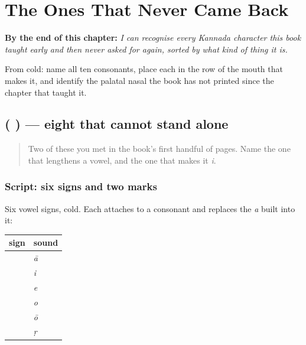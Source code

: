 
\chapter{The Ones That Never Came Back}
\label{ch:ka-ulidavu}

\begin{chapteropening}
\textbf{By the end of this chapter:} \emph{I can recognise every Kannada character this book taught early and then never asked for again, sorted by what kind of thing it is.}

From cold: name all ten consonants, place each in the row of the mouth that makes it, and identify the palatal nasal the book has not printed since the chapter that taught it.
\end{chapteropening}

\section[\texorpdfstring{(\kn{ಾ} \kn{ಿ} \kn{ೆ} \kn{ೊ} \kn{ೋ} \kn{ೃ} \kn{ಂ} \kn{ಃ})}{(ಾ ಿ ೆ ೊ ೋ ೃ ಂ ಃ)}]{(       ) — eight that cannot stand alone}

\label{lesson:KA-R81-signs-that-hang}



\begin{quote}
Two of these you met in the book's first handful of pages. Name the one that lengthens a vowel, and the one that makes it \emph{i}.
\end{quote}

\subsection*{Script: six signs and two marks}
Six vowel signs, cold. Each attaches to a consonant and replaces the \emph{a} built into it:

\noindent
\begin{tabularx}{\linewidth}{@{}>{\raggedright\arraybackslash}X>{\raggedright\arraybackslash}X@{}}
\toprule
\textbf{sign} & \textbf{sound} \\
\midrule
\textbf{\kn{ಾ}} & \emph{ā} \\
\textbf{\kn{ಿ}} & \emph{i} \\
\textbf{\kn{ೆ}} & \emph{e} \\
\textbf{\kn{ೊ}} & \emph{o} \\
\textbf{\kn{ೋ}} & \emph{ō} \\
\textbf{\kn{ೃ}} & \emph{ṛ} \\
\bottomrule
\end{tabularx}

